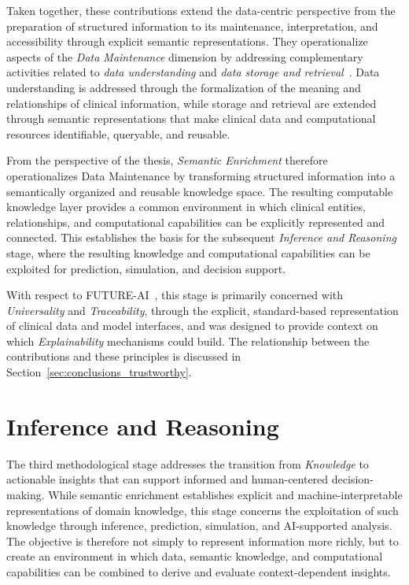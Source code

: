 Taken together, these contributions extend the data-centric perspective from the preparation of structured information to its maintenance, interpretation, and accessibility through explicit semantic representations. They operationalize aspects of the \emph{Data Maintenance} dimension by addressing complementary activities related to \emph{data understanding} and \emph{data storage and retrieval}~\cite{zha_data-centric_2025}. Data understanding is addressed through the formalization of the meaning and relationships of clinical information, while storage and retrieval are extended through semantic representations that make clinical data and computational resources identifiable, queryable, and reusable.

From the perspective of the thesis, \emph{Semantic Enrichment} therefore operationalizes Data Maintenance by transforming structured information into a semantically organized and reusable knowledge space. The resulting computable knowledge layer provides a common environment in which clinical entities, relationships, and computational capabilities can be explicitly represented and connected. This establishes the basis for the subsequent \emph{Inference and Reasoning} stage, where the resulting knowledge and computational capabilities can be exploited for prediction, simulation, and decision support.

With respect to FUTURE-AI~\cite{lekadir_future-ai_2025}, this stage is primarily concerned with \emph{Universality} and \emph{Traceability}, through the explicit, standard-based representation of clinical data and model interfaces, and was designed to provide context on which \emph{Explainability} mechanisms could build. The relationship between the contributions and these principles is discussed in Section~\ref{sec:conclusions_trustworthy}.

\section{Inference and Reasoning}
\label{sec:inference_reasoning}

The third methodological stage addresses the transition from \emph{Knowledge} to actionable insights that can support informed and human-centered decision-making. While semantic enrichment establishes explicit and machine-interpretable representations of domain knowledge, this stage concerns the exploitation of such knowledge through inference, prediction, simulation, and AI-supported analysis. The objective is therefore not simply to represent information more richly, but to create an environment in which data, semantic knowledge, and computational capabilities can be combined to derive and evaluate context-dependent insights.

